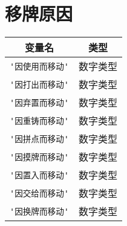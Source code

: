 \section{移牌原因}

\begin{center}
\begin{longtable}{|c|c|}
\hline \textbf{变量名} & \textbf{类型} \\
\hline \verb|'因使用而移动'| & 数字类型 \\
\hline \verb|'因打出而移动'| & 数字类型 \\
\hline \verb|'因弃置而移动'| & 数字类型 \\
\hline \verb|'因重铸而移动'| & 数字类型 \\
\hline \verb|'因拼点而移动'| & 数字类型 \\
\hline \verb|'因摸牌而移动'| & 数字类型 \\
\hline \verb|'因置入而移动'| & 数字类型 \\
\hline \verb|'因交给而移动'| & 数字类型 \\
\hline \verb|'因换牌而移动'| & 数字类型 \\
\hline
\end{longtable}
\end{center}
